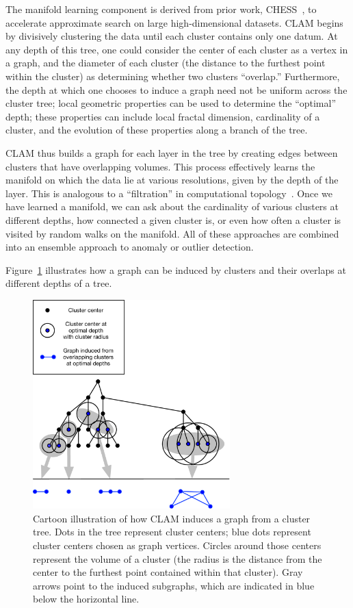The manifold learning component is derived from prior work, CHESS~\cite{ishaq2019entropy}, to accelerate approximate search on large high-dimensional datasets.
CLAM begins by divisively clustering the data until each cluster contains only one datum.
At any depth of this tree, one could consider the center of each cluster as a vertex in a graph, and the diameter of each cluster (the distance to the furthest point within the cluster) as determining whether two clusters ``overlap.''
Furthermore, the depth at which one chooses to induce a graph need not be uniform across the cluster tree;
local geometric properties can be used to determine the ``optimal'' depth;
these properties can include local fractal dimension, cardinality of a cluster, and the evolution of these properties along a branch of the tree.

CLAM thus builds a graph for each layer in the tree by creating edges between clusters that have overlapping volumes.
This process effectively learns the manifold on which the data lie at various resolutions, given by the depth of the layer.
This is analogous to a ``filtration'' in computational topology~\cite{carlsson2009topology}.
Once we have learned a manifold, we can ask about the cardinality of various clusters at different depths, how connected a given cluster is, or even how often a cluster is visited by random walks on the manifold.
All of these approaches are combined into an ensemble approach to anomaly or outlier detection.

Figure~\ref{fig:introduction:graph-generation} illustrates how a graph can be induced by clusters and their overlaps at different depths of a tree.

\begin{figure}[ht!]
   \centering
   \includegraphics[width=3in]{images/tree-graph.pdf}
   \caption{Cartoon illustration of how CLAM induces a graph from a cluster tree.
   Dots in the tree represent cluster centers;
   blue dots represent cluster centers chosen as graph vertices.
   Circles around those centers represent the volume of a cluster (the radius is the distance from the center to the furthest point contained within that cluster).
   Gray arrows point to the induced subgraphs, which are indicated in blue below the horizontal line.}
   \label{fig:introduction:graph-generation}
\end{figure}

